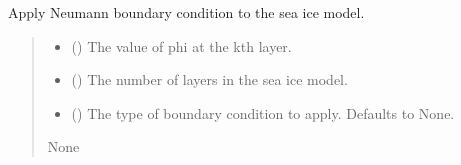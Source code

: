 \documentclass[a4paper,11pt,english,openany]{sphinxmanual}
\begin{document}
\begin{fulllineitems}
\begin{fulllineitems}
\begin{quote}
\begin{description}
\end{description}\end{quote}

\end{fulllineitems}


\begin{fulllineitems}
\label{\detokenize{api/spyice.models.sea_ice_model:src.spyice.models.sea_ice_model.SeaIceModel.bc_neumann}}
\pysigstartsignatures
\pysiglinewithargsret
{}
{\sphinxparamcomma {}\sphinxparamcomma {}}
{}
\pysigstopsignatures
\sphinxAtStartPar
Apply Neumann boundary condition to the sea ice model.
\begin{quote}\begin{description}
\begin{itemize}
\item {} 
\sphinxAtStartPar
{} () \textendash{} The value of phi at the k\sphinxhyphen{}th layer.

\item {} 
\sphinxAtStartPar
{} () \textendash{} The number of layers in the sea ice model.

\item {} 
\sphinxAtStartPar
{} (\sphinxstyleliteralemphasis{\sphinxupquote{, }}) \textendash{} The type of boundary condition to apply. Defaults to None.

\end{itemize}

\sphinxAtStartPar
None

\end{description}\end{quote}

\end{fulllineitems}



\end{fulllineitems}
\end{document}
